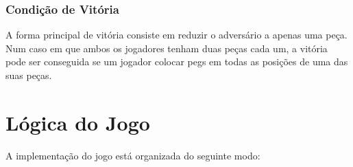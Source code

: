 \documentclass[paper=a4, fontsize=11pt]{scrartcl} %
\numberwithin{equation}{section} %
\numberwithin{figure}{section} %
\numberwithin{table}{section} %
\begin{document}
\subsubsection{Condição de Vitória}

A forma principal de vitória consiste em reduzir o adversário a apenas uma peça. Num caso em que ambos os jogadores tenham duas peças cada um, a vitória pode ser conseguida se um jogador colocar pegs em todas as posições de uma das suas peças.


\section{Lógica do Jogo}

A implementação do jogo está organizada do seguinte modo:
\end{document}
